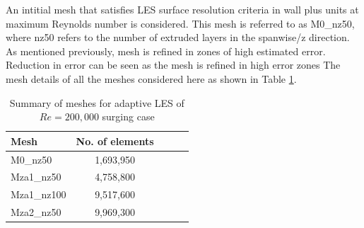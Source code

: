 An intitial mesh that satisfies LES surface resolution criteria in wall plus units at maximum Reynolds number is considered.
This mesh is referred to as M0\_nz50, where nz50 refers to the number of extruded layers in the spanwise/z direction.
As mentioned previously, mesh is refined in zones of high estimated error. 
Reduction in error can be seen as the mesh is refined in high error zones
The mesh details of all the meshes considered here as shown in Table \ref{table:adapt_mesh_details_Re200k}.

\begin{table}[H]
	\centering
	\caption{Summary of meshes for adaptive LES of $Re=200,000$ surging case}
	\label{table:adapt_mesh_details_Re200k}
	\begin{tabular}{|l|c|c|c|c|}
		\hline
		Mesh   & No. of elements \\
		\hline
		M0\_nz50	& 1,693,950 \\
		\hline
		Mza1\_nz50	& 4,758,800 \\
		\hline		
		Mza1\_nz100 & 9,517,600 \\
		\hline
		Mza2\_nz50  &  9,969,300 \\
		\hline
	\end{tabular}
\end{table}


